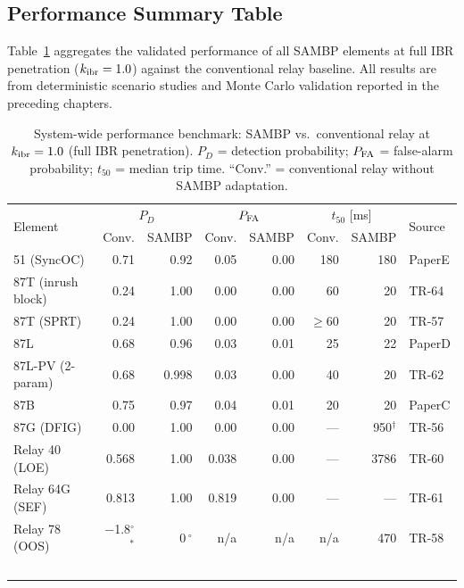 \subsection{Performance Summary Table}

Table~\ref{tab:ch7_perf_summary} aggregates the validated performance of all
SAMBP elements at full IBR penetration ($k_{\rm ibr} = 1.0$) against
the conventional relay baseline.  All results are from deterministic
scenario studies and Monte Carlo validation reported in the preceding chapters.

\begin{table}[ht]
  \centering
  \caption{System-wide performance benchmark: SAMBP vs.\ conventional
  relay at $k_{\rm ibr} = 1.0$ (full IBR penetration).  $P_D$ = detection
  probability; $P_{\rm FA}$ = false-alarm probability; $t_{50}$ = median
  trip time.  ``Conv.'' = conventional relay without SAMBP adaptation.}
  \label{tab:ch7_perf_summary}
  \small
  \begin{tabular}{lrrrrrrl}
    \toprule
    \multirow{2}{*}{Element} &
    \multicolumn{2}{c}{$P_D$} &
    \multicolumn{2}{c}{$P_{\rm FA}$} &
    \multicolumn{2}{c}{$t_{50}$ [ms]} &
    \multirow{2}{*}{Source} \\
    & Conv. & SAMBP & Conv. & SAMBP & Conv. & SAMBP & \\
    \midrule
    51 (SyncOC)          & 0.71 & 0.92  & 0.05 & 0.00  & 180  & 180  & PaperE \\
    87T (inrush block)   & 0.24 & 1.00  & 0.00 & 0.00  & 60   & 20   & TR-64  \\
    87T (SPRT)           & 0.24 & 1.00  & 0.00 & 0.00  & $\geq$60 & 20 & TR-57 \\
    87L                  & 0.68 & 0.96  & 0.03 & 0.01  & 25   & 22   & PaperD \\
    87L-PV (2-param)     & 0.68 & 0.998 & 0.03 & 0.00  & 40   & 20   & TR-62  \\
    87B                  & 0.75 & 0.97  & 0.04 & 0.01  & 20   & 20   & PaperC \\
    87G (DFIG)           & 0.00 & 1.00  & 0.00 & 0.00  & ---  & 950$^\dagger$ & TR-56  \\
    Relay 40 (LOE)       & 0.568 & 1.00 & 0.038 & 0.00 & ---  & 3786 & TR-60  \\
    Relay 64G (SEF)      & 0.813 & 1.00 & 0.819 & 0.00 & ---  & ---  & TR-61  \\
    Relay 78 (OOS)       & $-$1.8$^\circ$$^*$ & 0\,$^\circ$ & n/a & n/a & n/a & 470 & TR-58  \\
$$
\end{tabular}
\end{table}
